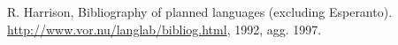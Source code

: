 %

\begin{thebibliography}{00} %
%
R. Harrison, Bibliography of planned languages (excluding Esperanto).  \url{http://www.vor.nu/langlab/bibliog.html}, 1992, agg. 1997.
%
\end{thebibliography}